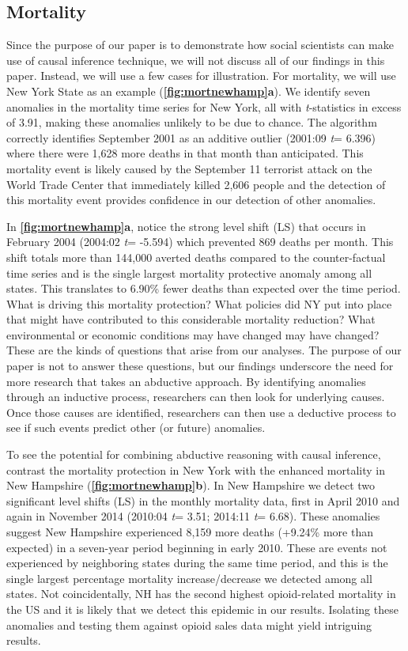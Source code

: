 \documentclass[12pt]{article}
\begin{document}
\hypertarget{mortality}{%
\subsection{Mortality}\label{mortality}}

Since the purpose of our paper is to demonstrate how social scientists
can make use of causal inference technique, we will not discuss all of
our findings in this paper. Instead, we will use a few cases for
illustration. For mortality, we will use New York State as an example
(\textbf{\autoref{fig:mortnewhamp}a}). We identify seven anomalies in
the mortality time series for New York, all with \emph{t}-statistics in
excess of 3.91, making these anomalies unlikely to be due to chance. The
algorithm correctly identifies September 2001 as an additive outlier
(2001:09 \emph{t}= 6.396) where there were 1,628 more deaths in that
month than anticipated. This mortality event is likely caused by the
September 11 terrorist attack on the World Trade Center that immediately
killed 2,606 people and the detection of this mortality event provides
confidence in our detection of other anomalies.

In \textbf{\autoref{fig:mortnewhamp}a}, notice the strong level shift
(LS) that occurs in February 2004 (2004:02 \emph{t}= -5.594) which
prevented 869 deaths per month. This shift totals more than 144,000
averted deaths compared to the counter-factual time series and is the
single largest mortality protective anomaly among all states. This
translates to 6.90\% fewer deaths than expected over the time period.
What is driving this mortality protection? What policies did NY put into
place that might have contributed to this considerable mortality
reduction? What environmental or economic conditions may have changed
may have changed? These are the kinds of questions that arise from our
analyses. The purpose of our paper is not to answer these questions, but
our findings underscore the need for more research that takes an
abductive approach. By identifying anomalies through an inductive
process, researchers can then look for underlying causes. Once those
causes are identified, researchers can then use a deductive process to
see if such events predict other (or future) anomalies.

To see the potential for combining abductive reasoning with causal
inference, contrast the mortality protection in New York with the
enhanced mortality in New Hampshire
(\textbf{\autoref{fig:mortnewhamp}b}). In New Hampshire we detect two
significant level shifts (LS) in the monthly mortality data, first in
April 2010 and again in November 2014 (2010:04 \emph{t}= 3.51; 2014:11
\emph{t}= 6.68). These anomalies suggest New Hampshire experienced 8,159
more deaths (+9.24\% more than expected) in a seven-year period
beginning in early 2010. These are events not experienced by neighboring
states during the same time period, and this is the single largest
percentage mortality increase/decrease we detected among all states. Not
coincidentally, NH has the second highest opioid-related mortality in
the US \citep{beetham2019access} and it is likely that we detect this
epidemic in our results. Isolating these anomalies and testing them
against opioid sales data might yield intriguing results.
\end{document}
